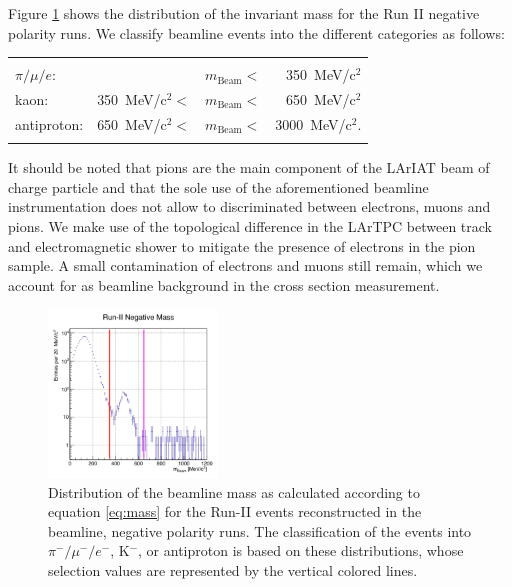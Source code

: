 \documentclass[aps,prl,twocolumn,showpacs,superscriptaddress,groupedaddress]{revtex4}  %
\begin{document}
Figure \ref{fig:mass} shows the distribution of the invariant mass for the Run II negative polarity runs. We classify beamline events into the different categories as follows:

\begin{tabular}{lllr}
& & & \\
 $\pi/\mu/e$: &                               & $m_{\text{Beam}}<$& 350~MeV/c$^2$\\
 kaon:           & 350~MeV/c$^2 <$ & $m_{\text{Beam}}<$& 650~MeV/c$^2$\\
 antiproton:   & 650~MeV/c$^2 <$ & $m_{\text{Beam}}<$& 3000~MeV/c$^2$.\\
& & & \\
\end{tabular}



It should be noted that pions are the main component of the LArIAT beam of charge particle and that the sole use of the aforementioned beamline instrumentation does not allow to discriminated between electrons, muons and pions. We make use of the topological difference in the LArTPC between track and electromagnetic shower to mitigate the presence of electrons in the pion sample. A small contamination of electrons and muons still remain, which we account for as beamline background in the cross section measurement.

\begin{figure}
  \centering  
\includegraphics[width =0.4\textwidth]{massRunII.png}
\caption{Distribution of the beamline mass as calculated according to equation \ref{eq:mass} for the Run-II events reconstructed in the beamline, negative polarity runs. The classification of the events into $\pi^-/ \mu^-/e^-$, K$^-$, or antiproton is based on these distributions, whose selection values are represented by the vertical colored lines.}
\label{fig:mass}
\end{figure}
\end{document}

